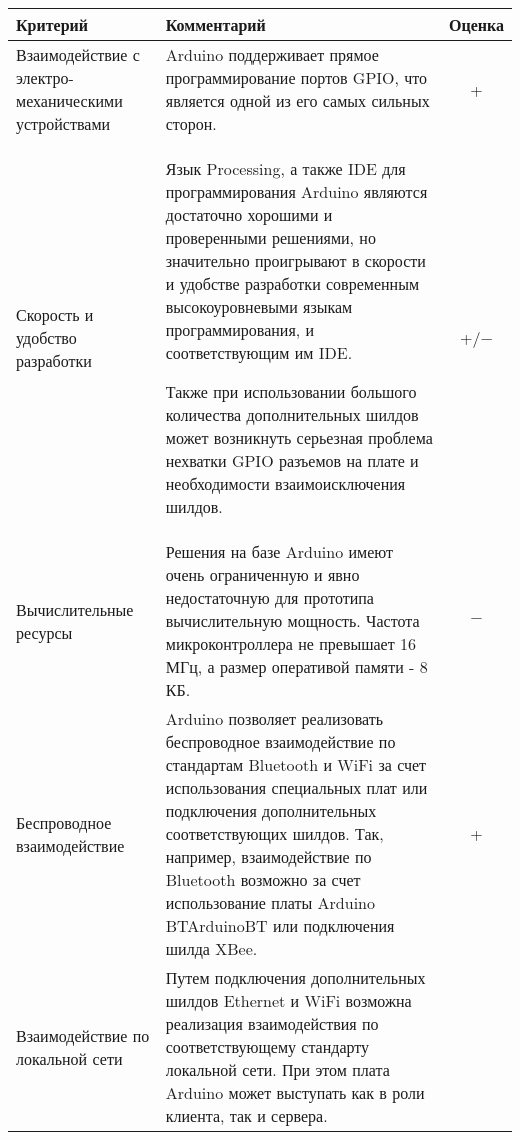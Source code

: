 \documentclass[twoside,a4paper]{msmb} %
\begin{document}
\begin{longtable}{| p{} | p{} | c |} 

\hline
Критерий & Комментарий & Оценка \\
\hline
Взаимодействие с электро-механическими  устройствами &

Arduino поддерживает прямое программирование портов GPIO, что является одной из его самых сильных сторон\cite{ArduinoGPIO}. &

+ \\

\hline
Скорость и удобство разработки &

Язык Processing, а также IDE для программирования Arduino являются достаточно хорошими и проверенными решениями, но значительно проигрывают в скорости и удобстве разработки современным высокоуровневыми языкам программирования, и соответствующим им IDE.

Также при использовании большого количества дополнительных шилдов может возникнуть серьезная проблема нехватки GPIO разъемов на плате и необходимости взаимоисключения шилдов. &

+/$-$\\

\hline
Вычислительные ресурсы &

Решения на базе Arduino имеют очень ограниченную и явно недостаточную для прототипа вычислительную мощность. Частота микроконтроллера не превышает 16 МГц, а размер оперативой памяти - 8 КБ\cite{Arduino Memory}. &

$-$\\

\hline
Беспроводное взаимодействие &

Arduino позволяет реализовать беспроводное взаимодействие по стандартам Bluetooth и WiFi за счет использования специальных плат или подключения дополнительных соответствующих шилдов. Так, например, взаимодействие по Bluetooth возможно за счет использование платы Arduino BT{ArduinoBT} или подключения шилда XBee\cite{XBee}. &

+\\

\hline
Взаимодействие по локальной сети &

Путем подключения дополнительных шилдов Ethernet\cite{ArduinoEthernet} и WiFi\cite{ArduinoWiFi} возможна реализация взаимодействия по соответствующему стандарту локальной сети. При этом плата Arduino может выступать как в роли клиента\cite{ArduinoClient}, так и сервера\cite{ArduinoServer}.&


\end{longtable}
\end{document}
